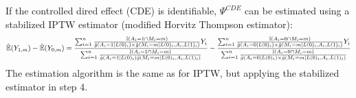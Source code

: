 \documentclass[
]{book}
\begin{document}
If the controlled dired effect (CDE) is identifiable, \(\Psi^{CDE}\) can be estimated using a stabilized IPTW estimator (modified Horvitz Thompson estimator):
\begin{equation}
\small
\hat{\mathbb{E}}(Y_{1,m}) - \hat{\mathbb{E}}(Y_{0,m}) =  \frac{ \sum_{i=1}^n \frac{\mathbb{I}(A_i=1 \cap M_i=m)}{\hat{g}(A_i=1 \mid L(0)_i) \times \hat{g}(M_i=m \mid L(0)_i,A_i,L(1)_i)} Y_i}{\sum_{i=1}^n \frac{\mathbb{I}(A_i=1 \cap M_i=m)}{\hat{g}(A_i=1 \mid L(0)_i) \hat{g}(M_i=m \mid L(0)_i,A_i,L(1)_i)}} - \frac{ \sum_{i=1}^n \frac{\mathbb{I}(A_i=0 \cap M_i=m)}{\hat{g}(A_i=0 \mid L(0)_i) \times \hat{g}(M_i=m \mid L(0)_i,A_i,L(1)_i)} Y_i}{ \sum_{i=1}^n \frac{\mathbb{I}(A_i=0 \cap M_i=m)}{\hat{g}(A_i=0 \mid L(0)_i) \times \hat{g}(M_i=m \mid L(0)_i,A_i,L(1)_i)}}
\end{equation}
The estimation algorithm is the same as for IPTW, but applying the stabilized estimator in step 4.
\end{document}
